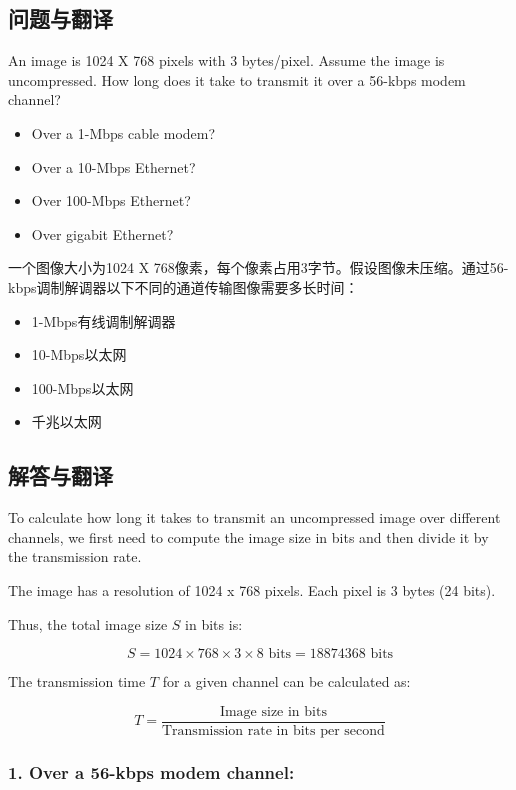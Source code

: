 \subsection{问题与翻译}

An image is 1024 X 768 pixels with 3 bytes/pixel. Assume the image is uncompressed. How long does it take to transmit it over a 56-kbps modem channel?

\begin{itemize}
\item Over a 1-Mbps cable modem?
\item Over a 10-Mbps Ethernet?
\item Over 100-Mbps Ethernet?
\item Over gigabit Ethernet?
\end{itemize}

一个图像大小为1024 X 768像素，每个像素占用3字节。假设图像未压缩。通过56-kbps调制解调器以下不同的通道传输图像需要多长时间：

\begin{itemize}
\item 1-Mbps有线调制解调器
\item 10-Mbps以太网
\item 100-Mbps以太网
\item 千兆以太网
\end{itemize}

\subsection{解答与翻译}


To calculate how long it takes to transmit an uncompressed image over different channels, we first need to compute the image size in bits and then divide it by the transmission rate.

The image has a resolution of 1024 x 768 pixels.  
Each pixel is 3 bytes (24 bits).  

Thus, the total image size \( S \) in bits is:

\[
S = 1024 \times 768 \times 3 \times 8 \text{ bits} = 18874368 \text{ bits}
\]

The transmission time \( T \) for a given channel can be calculated as:

\[
T = \frac{\text{Image size in bits}}{\text{Transmission rate in bits per second}}
\]

\subsubsection*{1. Over a 56-kbps modem channel:}

